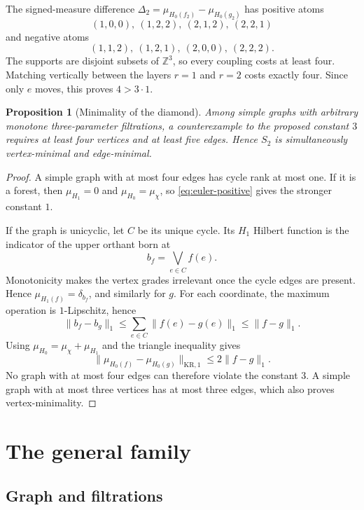 \documentclass[11pt]{article}
\newtheorem{proposition}[proposition]{Proposition}
\theoremstyle{definition}
\newcommand{\Z}{\mathbb{Z}}
\newcommand{\1}{\mathbf{1}}
\newcommand{\KR}{\mathrm{KR}}
\begin{document}
The signed-measure difference $\Delta_2=\mu_{H_0(f_2)}-\mu_{H_0(g_2)}$
has positive atoms
\[
 (1,0,0),\ (1,2,2),\ (2,1,2),\ (2,2,1)
\]
and negative atoms
\[
 (1,1,2),\ (1,2,1),\ (2,0,0),\ (2,2,2).
\]
The supports are disjoint subsets of $\Z^3$, so every coupling costs at
least four.  Matching vertically between the layers $r=1$ and $r=2$ costs
exactly four.  Since only $e$ moves, this proves $4>3\cdot1$.

\begin{proposition}[Minimality of the diamond]\label{prop:minimal}
Among simple graphs with arbitrary monotone three-parameter filtrations, a
counterexample to the proposed constant $3$ requires at least four vertices
and at least five edges.  Hence $S_2$ is simultaneously vertex-minimal and
edge-minimal.
\end{proposition}

\begin{proof}
A simple graph with at most four edges has cycle rank at most one.  If it is
a forest, then $\mu_{H_1}=0$ and
$\mu_{H_0}=\mu_\chi$, so \eqref{eq:euler-positive} gives the stronger
constant $1$.

If the graph is unicyclic, let $C$ be its unique cycle.  Its $H_1$ Hilbert
function is the indicator of the upper orthant born at
\[
  b_f=\bigvee_{e\in C}f(e).
\]
Monotonicity makes the vertex grades irrelevant once the cycle edges are
present.  Hence $\mu_{H_1(f)}=\delta_{b_f}$, and similarly for $g$.  For each
coordinate, the maximum operation is $1$-Lipschitz, hence
\[
  \lVert b_f-b_g\rVert_1
  \leq\sum_{e\in C}\lVert f(e)-g(e)\rVert_1
  \leq\lVert f-g\rVert_1.
\]
Using $\mu_{H_0}=\mu_\chi+\mu_{H_1}$ and the triangle inequality gives
\[
  \lVert\mu_{H_0(f)}-\mu_{H_0(g)}\rVert_{\KR,1}
  \leq2\lVert f-g\rVert_1.
\]
No graph with at most four edges can therefore violate the constant $3$.
A simple graph with at most three vertices has at most three edges, which
also proves vertex-minimality.
\end{proof}

\section{The general family}\label{sec:family}

\subsection{Graph and filtrations}
\end{document}
